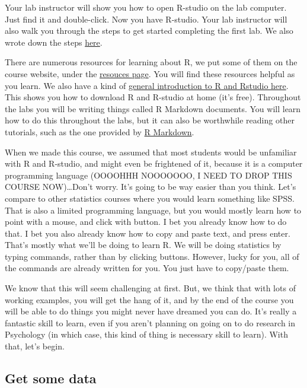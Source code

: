 \documentclass[]{book}
\begin{document}
Your lab instructor will show you how to open R-studio on the lab
computer. Just find it and double-click. Now you have R-studio. Your lab
instructor will also walk you through the steps to get started
completing the first lab. We also wrote down the steps
\href{https://crumplab.github.io/statisticsLab/software.html\#how-to-complete-the-r-labs}{here}.

There are numerous resources for learning about R, we put some of them
on the course website, under the
\href{https://crumplab.github.io/psyc3400/Resources.html}{resouces
page}. You will find these resources helpful as you learn. We also have
a kind of
\href{https://crumplab.github.io/statisticsLab/software.html\#r}{general
introduction to R and Rstudio here}. This shows you how to download R
and R-studio at home (it's free). Throughout the labs you will be
writing things called R Markdown documents. You will learn how to do
this throughout the labs, but it can also be worthwhile reading other
tutorials, such as the one provided by
\href{https://rmarkdown.rstudio.com/lesson-1.html}{R Markdown}.

When we made this course, we assumed that most students would be
unfamiliar with R and R-studio, and might even be frightened of it,
because it is a computer programming language (OOOOHHH NOOOOOOO, I NEED
TO DROP THIS COURSE NOW)\ldots{}Don't worry. It's going to be way easier
than you think. Let's compare to other statistics courses where you
would learn something like SPSS. That is also a limited programming
language, but you would mostly learn how to point with a mouse, and
click with button. I bet you already know how to do that. I bet you also
already know how to copy and paste text, and press enter. That's mostly
what we'll be doing to learn R. We will be doing statistics by typing
commands, rather than by clicking buttons. However, lucky for you, all
of the commands are already written for you. You just have to copy/paste
them.

We know that this will seem challenging at first. But, we think that
with lots of working examples, you will get the hang of it, and by the
end of the course you will be able to do things you might never have
dreamed you can do. It's really a fantastic skill to learn, even if you
aren't planning on going on to do research in Psychology (in which case,
this kind of thing is necessary skill to learn). With that, let's begin.

\subsection{Get some data}\label{get-some-data}
\end{document}
